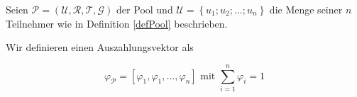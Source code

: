 \begin{Fazit}

Seien $\mathcal{P} = \left( \mathcal{U}, \mathcal{R}, \mathcal{T}, \mathcal{G} \right)$ 
der Pool und $\mathcal{U} = \left\{ u_1; u_2;...;u_n \right\}$ die Menge seiner $n$ Teilnehmer wie in Definition \ref{defPool} beschrieben.

\vspace{0.1cm}

Wir definieren einen Auszahlungsvektor als

\begin{equation*}
  \varphi_{\mathcal{P}} = [\varphi_1, \varphi_1, ..., \varphi_n] \text{ mit } \sum_{i=1}^{n} \varphi_i = 1 
\end{equation*}

\vspace{0.2cm}


\vspace{0.2cm}


\vspace{0.2cm}


\end{Fazit}

\vspace{0.3cm}


\vspace{0.5cm}
